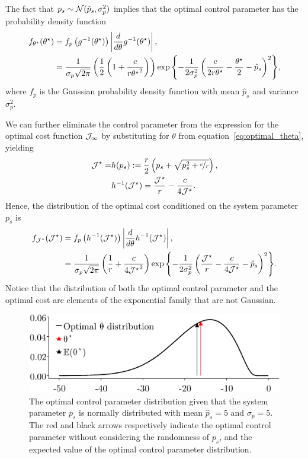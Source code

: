 %
The fact that $p_s \sim \mathcal{N}(\hat{p}_s, \sigma_p^2)$ implies that the optimal
control parameter has the probability density function
%
\begin{align*} 
    f_{\theta^\star}(\theta^\star) &= f_p\left(g^{-1}(\theta^\star)\right)
        \left|{\frac{d}{d\theta}g^{-1}(\theta^\star)}\right|, \\ 
        &= \frac{1}{\sigma_p
        \sqrt{2\pi}}\left(\frac{1}{2}\left(1+\frac{c}{r{\theta^\star}^2}\right)\right)
        \exp{\left\{-\frac{1}{2\sigma_p^2}\left(
        \frac{c}{2r\theta^\star} - \frac{\theta^\star}{2} - \hat{p}_s
        \right)^2\right\}}, 
\end{align*}
%
where $f_p$ is the Gaussian probability density function with mean $\hat{p}_s$ and
variance $\sigma_p^2$. 

We can further eliminate the control parameter from the
expression for the optimal cost function $\mathcal{J}_\infty$ by
substituting for $\theta$ from
equation~\eqref{eq:optimal_theta}, yielding 
%
\begin{align*}
\mathcal{J}^\star = &h(p_s) := \frac{r}{2}\left( p_s +
\sqrt{p_s^2 + \nicefrac{c}{r}} \right), \\
&h^{-1}(\mathcal{J}^\star) = \frac{\mathcal{J}^\star}{r} -
\frac{c}{4\mathcal{J}^\star}.
\end{align*}
%
Hence, the distribution of the optimal cost conditioned on the system parameter
$p_s$ is 
%
\begin{align*} 
    f_{\mathcal{J}^\star}(\mathcal{J}^\star) &=f_p\left(h^{-1}(\mathcal{J}^\star)\right)
        \left|{\frac{d}{d\theta}h^{-1}(\mathcal{J}^\star)}\right|, \\
        &= \frac{1}{\sigma_p
        \sqrt{2\pi}}\left(\frac{1}{r} + \frac{c}{4{\mathcal{J}^\star}^2}\right)
        \exp{\left\{ -\frac{1}{2\sigma_p^2} \left(
        \frac{\mathcal{J}^\star}{r} - \frac{c}{4\mathcal{J}^\star} -
        \hat{p}_s\right)^2\right\}}.
\end{align*}
%
Notice that the distribution of both the optimal control parameter and the
optimal cost are elements of the exponential family that are not Gaussian. 

\begin{figure}[tb]
  \centering
  \includegraphics[width=0.7\linewidth]{./figures/optimal-dist.eps}
  \caption{The optimal control parameter distribution given that the system
  parameter $p_s$ is normally distributed with mean $\hat{p}_s = 5$ and $\sigma_p
  = 5$. The red and black arrows respectively indicate the optimal control
  parameter without considering the randomness of $p_s$, and the expected value
  of the optimal control parameter distribution.}
  \label{fig:optimal_dist}
\end{figure}


